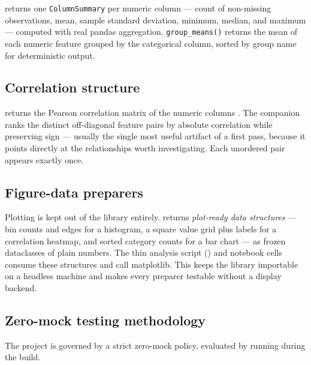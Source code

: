 \documentclass[
  english,
]{article}
\begin{document}
 returns one
\texttt{ColumnSummary} per numeric column --- count of non-missing
observations, mean, sample standard deviation, minimum, median, and
maximum --- computed with real pandas aggregation.
\texttt{group\_means()} returns the mean of each numeric feature grouped
by the categorical column, sorted by group name for deterministic
output.

\subsection{Correlation structure}\label{correlation-structure}

 returns the
Pearson correlation matrix of the numeric columns \citep{tukey1977eda}.
The companion  ranks the
distinct off-diagonal feature pairs by absolute correlation while
preserving sign --- usually the single most useful artifact of a first
pass, because it points directly at the relationships worth
investigating. Each unordered pair appears exactly once.

\subsection{Figure-data preparers}\label{figure-data-preparers}

Plotting is kept out of the library entirely.
 returns \emph{plot-ready data structures}
--- bin counts and edges for a histogram, a square value grid plus
labels for a correlation heatmap, and sorted category counts for a bar
chart --- as frozen dataclasses of plain numbers. The thin analysis
script () and notebook cells consume
these structures and call matplotlib. This keeps the library importable
on a headless machine and makes every preparer testable without a
display backend.

\subsection{Zero-mock testing
methodology}\label{zero-mock-testing-methodology}

The project is governed by a strict zero-mock policy, evaluated by
running
during the build.
\end{document}
